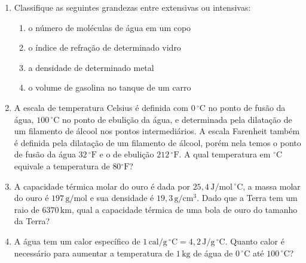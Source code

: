 \begin{enumerate}
    \item Classifique as seguintes grandezas entre extensivas ou intensivas:
    \begin{enumerate}
        \item o número de moléculas de água em um copo
        \item o índice de refração de determinado vidro
        \item a densidade de determinado metal
        \item o volume de gasolina no tanque de um carro
    \end{enumerate}

    \item 
        A escala de temperatura Celsius é definida com $0\,\mathrm{^\circ C}$
        no ponto de fusão da água, $100\,\mathrm{^\circ C}$ no ponto de ebulição
        da água, e determinada pela dilatação de um filamento de álcool nos
        pontos intermediários. A escala Farenheit também é definida pela
        dilatação de um filamento de álcool, porém nela temos o ponto de fusão
        da água $32 \,\mathrm{^\circ F}$ e o de ebulição
        $212\,\mathrm{^\circ F}$. A qual temperatura em $\mathrm{^\circ C}$
        equivale a temperatura de $80\mathrm{^\circ F}$?

    \item 
        A capacidade térmica molar do ouro é dada por $25{,}4\,\mathrm{J/mol
        \,^\circ C}$, a massa molar do ouro é $197\,\mathrm{g/mol}$ e sua
        densidade é $19{,}3\,\mathrm{g/cm^3}$. Dado que a Terra tem um raio de
        $6370\,\mathrm {km}$, qual a capacidade térmica de uma bola de ouro do
        tamanho da Terra?

    \item 
        A água tem um calor específico de $1\,\mathrm{cal/g\,^\circ C}=4{,}2
        \,\mathrm{J/g\,^\circ C}$. Quanto calor é necessário para aumentar a
        temperatura de $1\,\mathrm{kg}$ de água de $0\,\mathrm{^\circ C}$ até
        $100\,\mathrm{^\circ C}$?


\end{enumerate}
